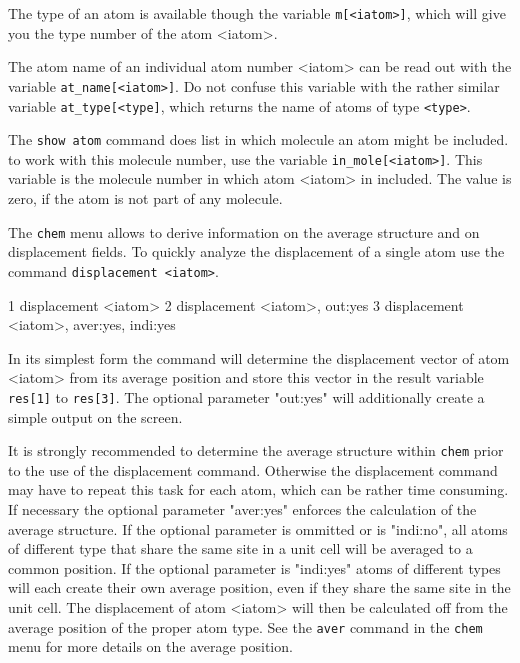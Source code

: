 The type of an atom is available though the variable {\tt m[<iatom>]}, which will 
give you the type number of the atom <iatom>.

The atom name of an individual atom number <iatom> can be read out with the 
variable {\tt at\_name[<iatom>]}. Do not confuse this variable with the rather
similar variable {\tt at\_type[<type]}, which returns the name of atoms of type
{\tt <type>}.

The {\tt show atom} command does list in which molecule an atom might be included.
to work with this molecule number, use the variable {\tt in\_mole[<iatom>]}. 
This variable is the molecule number in which atom <iatom> in included. The value
is zero, if the atom is not part of any molecule.

The {\tt chem} menu allows to derive information on the average structure and 
on displacement fields. To quickly analyze the displacement of a single atom 
use the command {\tt displacement <iatom>}. 

\begin{MacVerbatim}
 1 displacement <iatom>
 2 displacement <iatom>, out:yes
 3 displacement <iatom>, aver:yes, indi:yes
\end{MacVerbatim}

In its simplest form the command will determine the displacement vector of atom
<iatom> from its average position and store this vector in the result variable
{\tt res[1]} to {\tt res[3]}. The optional parameter "out:yes" will additionally 
create a simple output on the screen.

It is strongly recommended to determine the average structure within {\tt chem}
prior to the use of the displacement command. Otherwise the displacement 
command may have to repeat this task for each atom, which can be rather time
consuming. If necessary the optional parameter "aver:yes" enforces the calculation
of the average structure. If the optional parameter is ommitted or is "indi:no",
all atoms of different type that share the same site in a unit cell will be averaged
to a common position. If the optional parameter is "indi:yes" atoms of different 
types will each create their own average position, even if they share the same site in 
the unit cell. The displacement of atom <iatom> will then be calculated off from the
average position of the proper atom type. See the {\tt aver} command in 
the {\tt chem} menu for more details on the average position.
